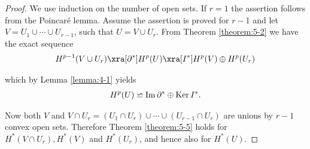 \begin{proof}
  We use induction on the number of open sets. If $r = 1$ the assertion
follows from the Poincar\'e lemma. Assume the assertion is proved for $r - 1$ and
let $V = U_1\cup\cdots\cup U_{r-1}$, such that $U = V\cup U_r$. From Theorem \ref{theorem:5-2} we have 
the exact sequence
\begin{align*}
  H^{p-1}(V\cup U_r) \xra[\partial^*] H^p(U) \xra[I^*] H^p(V)\oplus H^p(U_r)
\end{align*}

which by Lemma \ref{lemma:4-1} yields
\begin{align*}
  H^p(U) \backsimeq \operatorname{Im}\partial^* \oplus \operatorname{Ker} I^*.
\end{align*}

Now both $V$ and $V\cap U_r = (U_1\cap U_r)\cup\cdots\cup (U_{r-1}\cap U_r)$ are unions by $r-1$ convex open sets.
Therefore Theorem \ref{theorem:5-5} holds for $H^*(V\cap U_r), H^*(V)$ and $H^*(U_r)$, and hence also for $H^*(U)$.
\end{proof}